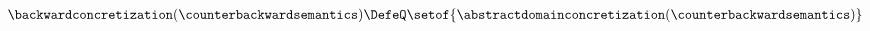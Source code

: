 
\begin{align*}
  \backwardconcretization(\counterbackwardsemantics) \DefeQ \setof{\abstractdomainconcretization(\counterbackwardsemantics)}
  \end{align*}
